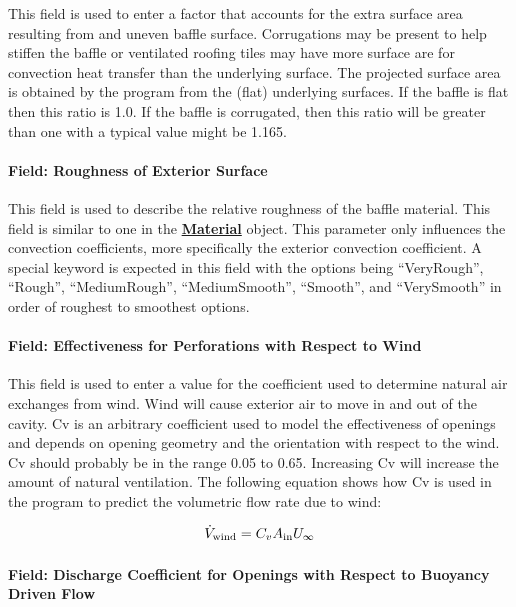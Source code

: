 This field is used to enter a factor that accounts for the extra surface area resulting from and uneven baffle surface. Corrugations may be present to help stiffen the baffle or ventilated roofing tiles may have more surface are for convection heat transfer than the underlying surface. The projected surface area is obtained by the program from the (flat) underlying surfaces. If the baffle is flat then this ratio is 1.0. If the baffle is corrugated, then this ratio will be greater than one with a typical value might be 1.165.

\paragraph{Field: Roughness of Exterior Surface}\label{field-roughness-of-exterior-surface}

This field is used to describe the relative roughness of the baffle material. This field is similar to one in the \textbf{\hyperref[material]{Material}} object. This parameter only influences the convection coefficients, more specifically the exterior convection coefficient. A special keyword is expected in this field with the options being ``VeryRough'', ``Rough'', ``MediumRough'', ``MediumSmooth'', ``Smooth'', and ``VerySmooth'' in order of roughest to smoothest options.

\paragraph{Field: Effectiveness for Perforations with Respect to Wind}\label{field-effectiveness-for-perforations-with-respect-to-wind}

This field is used to enter a value for the coefficient used to determine natural air exchanges from wind. Wind will cause exterior air to move in and out of the cavity. Cv is an arbitrary coefficient used to model the effectiveness of openings and depends on opening geometry and the orientation with respect to the wind. Cv should probably be in the range 0.05 to 0.65. Increasing Cv will increase the amount of natural ventilation. The following equation shows how Cv is used in the program to predict the volumetric flow rate due to wind:

\begin{equation}
  \dot{V}_{\rm{wind}} = C_v A_{\rm{in}} U_{\infty}
\end{equation}

\paragraph{Field: Discharge Coefficient for Openings with Respect to Buoyancy Driven Flow}\label{field-discharge-coefficient-for-openings-with-respect-to-buoyancy-driven-flow}

